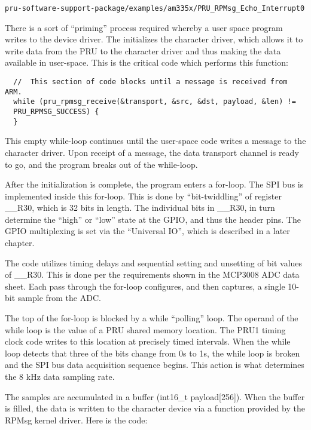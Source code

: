 \begin{verbatim}
pru-software-support-package/examples/am335x/PRU_RPMsg_Echo_Interrupt0
\end{verbatim}

There is a sort of ``priming'' process required whereby a user space program writes
to the device driver.  The initializes the character driver, which allows it to write data from
the PRU to the character driver and thus making the data available in user-space.  This is the critical
code which performs this function:

\begin{verbatim}
  //  This section of code blocks until a message is received from ARM.
  while (pru_rpmsg_receive(&transport, &src, &dst, payload, &len) !=
  PRU_RPMSG_SUCCESS) {
  }
\end{verbatim}

This empty while-loop continues until the user-space code writes a message to the character driver.  Upon receipt of a message, the data transport channel is ready to go, and the program breaks out of the while-loop.

After the initialization is complete, the program enters a for-loop.  The SPI bus is implemented inside this for-loop.  This is done by ``bit-twiddling'' of register \_\_R30, which is 32 bits in length.  The individual bits in \_\_R30, in turn determine the ``high'' or ``low'' state at the GPIO, and thus the header pins.  The GPIO multiplexing is set via the ``Universal IO'', which is described in a later chapter.

The code utilizes timing delays and sequential setting and unsetting of bit values of \_\_R30.  This is done per the requirements shown in the MCP3008 ADC data sheet. Each pass through the for-loop configures, and then captures, a single 10-bit sample from the ADC.

The top of the for-loop is blocked by a while ``polling'' loop.  The operand of the while loop is the value of a PRU shared memory location.  The PRU1 timing clock code writes to this location at precisely timed intervals.  When the while loop detects that three of the bits change from 0s to 1s, the while loop is broken and the SPI bus data acquisition sequence begins.  This action is what determines the 8 kHz data sampling rate.

The samples are accumulated in a buffer (int16\_t payload[256]).  When the buffer is filled, the data is written to the character device via a function provided by the RPMsg kernel driver.  Here is the code:

